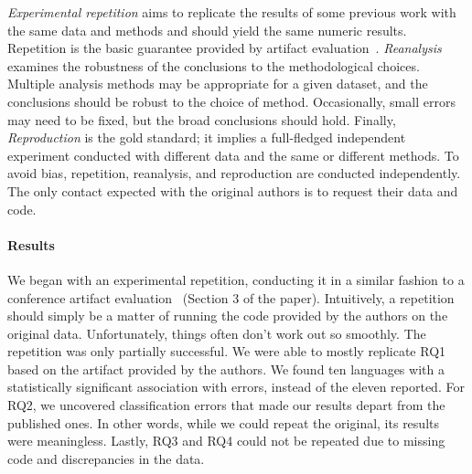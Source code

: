 \documentclass[acmsmall]{acmart}
\begin{document}
\noindent \emph{Experimental repetition} aims to replicate the results of
some previous work with the same data and methods and should yield the same
numeric results.  Repetition is the basic guarantee provided by artifact
evaluation~\cite{cacm15}.  \emph{Reanalysis} examines the robustness of the
conclusions to the methodological choices. Multiple analysis methods may be
appropriate for a given dataset, and the conclusions should be robust to the
choice of method. Occasionally, small errors may need to be fixed, but the
broad conclusions should hold. Finally, \emph{Reproduction} is the gold
standard; it implies a full-fledged independent experiment conducted with
different data and the same or different methods. To avoid bias, repetition,
reanalysis, and reproduction are conducted independently.  The only contact
expected with the original authors is to request their data and code.

\paragraph{Results} We began with an experimental repetition, conducting
it in a similar fashion to a conference artifact evaluation~\cite{cacm15}
(Section 3 of the paper).  Intuitively, a repetition should simply
be a matter of running the code provided by the authors on the original
data.  Unfortunately, things often don't work out so smoothly.  The
repetition was only partially successful. We were able to mostly replicate
RQ1 based on the artifact provided by the authors. We found ten languages
with a statistically significant association with errors, instead of the
eleven reported. For RQ2, we uncovered classification errors that made our
results depart from the published ones. In other words, while we could
repeat the original, its results were meaningless. Lastly, RQ3 and RQ4 could
not be repeated due to missing code and discrepancies in the data. 
\end{document}
